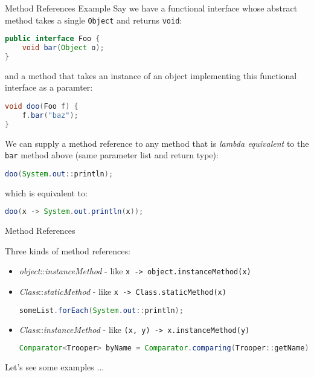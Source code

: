 \documentclass{beamer}
\begin{document}
\begin{frame}[fragile]{Method References Example}
\vspace{-.05in}
Say we have a functional interface whose abstract method takes a single {\tt Object} and returns {\tt void}:
\vspace{-.05in}
\begin{lstlisting}[language=Java]
public interface Foo {
    void bar(Object o);
}
\end{lstlisting}
\vspace{-.05in}
and a method that takes an instance of an object implementing this functional interface as a paramter:
\vspace{-.05in}
\begin{lstlisting}[language=Java]
void doo(Foo f) {
    f.bar("baz");
}
\end{lstlisting}
\vspace{-.05in}
We can supply a method reference to any method that is {\it lambda equivalent} to the {\tt bar} method above (same parameter list and return type):
\vspace{-.05in}
\begin{lstlisting}[language=Java]
doo(System.out::println);
\end{lstlisting}
\vspace{-.05in}
 which is equivalent to:
\vspace{-.05in}
\begin{lstlisting}[language=Java]
doo(x -> System.out.println(x));
\end{lstlisting}

\end{frame}

\begin{frame}[fragile]{Method References}

Three kinds of method references:
\begin{itemize}
\item {\it object}::{\it instanceMethod} - like {\tt x -> object.instanceMethod(x)}

\item {\it Class}::{\it staticMethod} - like {\tt x -> Class.staticMethod(x)}
\begin{lstlisting}[language=Java]
someList.forEach(System.out::println);
\end{lstlisting}

\item {\it Class}::{\it instanceMethod} - like {\tt (x, y) -> x.instanceMethod(y)}
\begin{lstlisting}[language=Java]
Comparator<Trooper> byName = Comparator.comparing(Trooper::getName);
\end{lstlisting}

\end{itemize}

Let's see some examples ...

\end{frame}
\end{document}
